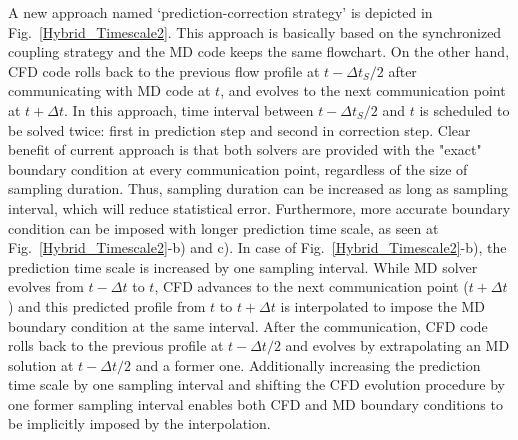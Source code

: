 \documentclass[preprint,12pt]{elsarticle}
\begin{document}
A new approach named `prediction-correction strategy' is depicted in Fig.~\ref{Hybrid_Timescale2}. This approach is basically based on the synchronized coupling strategy and the MD code keeps the same flowchart. On the other hand, CFD code rolls back to the previous flow profile at $t-{\Delta}t_{S}/{2}$ after communicating with MD code at $t$, and evolves to the next communication point at $t+{\Delta}t$. In this approach, time interval between $t - {\Delta}t_{S}/{2}$ and $t$ is scheduled to be solved twice: first in prediction step and second in correction step. Clear benefit of current approach is that both solvers are provided with the "exact" boundary condition at every communication point, regardless of the size of sampling duration. Thus, sampling duration can be increased as long as sampling interval, which will reduce statistical error. Furthermore, more accurate boundary condition can be imposed with longer prediction time scale, as seen at Fig.~\ref{Hybrid_Timescale2}-b) and c). In case of Fig.~\ref{Hybrid_Timescale2}-b), the prediction time scale is increased by one sampling interval. While MD solver evolves from $t-{\Delta}t$ to $t$, CFD advances to the next communication point ($t+{\Delta}t$) and this predicted profile from $t$ to $t+{\Delta}t$ is interpolated to impose the MD boundary condition at the same interval. After the communication, CFD code rolls back to the previous profile at $t-{\Delta}t/2$ and evolves by extrapolating an MD solution at $t-{\Delta}t/2$ and a former one. Additionally increasing the prediction time scale by one sampling interval and shifting the CFD evolution procedure by one former sampling interval enables both CFD and MD boundary conditions to be implicitly imposed by the interpolation.

\end{document}
